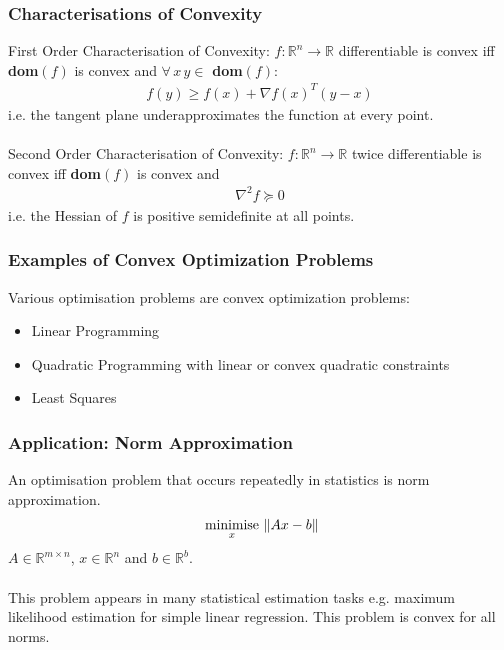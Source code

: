 \documentclass{beamer}
\DeclarePairedDelimiter\norm{\lVert}{\rVert}
\def\rnum{\mathbb{R}}
\begin{document}
\begin{frame}
    \frametitle{Characterisations of Convexity}
    First Order Characterisation of Convexity: $f : \rnum^{n} \rightarrow \rnum$
    differentiable is convex iff \textbf{dom}$(f)$ is convex and $\forall \, x
    \, y \in$ \textbf{dom}$(f)$:
    \begin{align*}
        f(y) \geq f(x) + \nabla f(x)^{T}(y-x)
    \end{align*}
    i.e. the tangent plane underapproximates the function at every point.
    \\~\\
    Second Order Characterisation of Convexity: $f : \rnum^{n} \rightarrow
    \rnum$ twice differentiable is convex iff \textbf{dom}$(f)$ is convex and
    \begin{align*}
        \nabla^{2}f \succeq 0
    \end{align*}
    i.e. the Hessian of $f$ is positive semidefinite at all points.
\end{frame}


\begin{frame}
    \frametitle{Examples of Convex Optimization Problems}
    Various optimisation problems are convex optimization problems:
    \begin{itemize}
        \item Linear Programming
        \item Quadratic Programming with linear or convex quadratic constraints
        \item Least Squares
    \end{itemize}
\end{frame}

\begin{frame}
    \frametitle{Application: Norm Approximation}
    An optimisation problem that occurs repeatedly in statistics is norm
    approximation.
    \begin{align*}
        \underset{x}{\text{ minimise }}\norm{Ax - b}
    \end{align*}
    $A \in \rnum^{m\times n}$, $x \in \rnum^{n}$ and $b \in \rnum^{b}$.
    \\~\\
    This problem appears in many statistical estimation tasks e.g. maximum
    likelihood estimation for simple linear regression. This problem is convex
    for all norms.
\end{frame}
\end{document}
